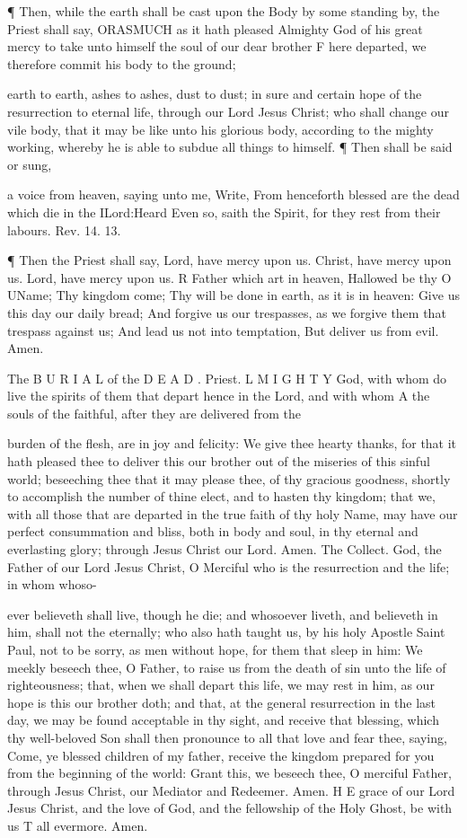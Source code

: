 ¶ Then, while the earth shall be cast upon the Body by some standing by, the Priest shall say, ORASMUCH as it hath pleased Almighty God of his great mercy to take unto himself the soul of our dear brother F here departed, we therefore commit his body to the ground;

earth to earth, ashes to ashes, dust to dust; in sure and certain hope of the resurrection to eternal life, through our Lord Jesus Christ; who shall change our vile body, that it may be like unto his glorious body, according to the mighty working, whereby he is able to subdue all things to himself. ¶ Then shall be said or sung,

a voice from heaven, saying unto me, Write, From henceforth blessed are the dead which die in the ILord:Heard Even so, saith the Spirit, for they rest from their labours. Rev. 14. 13.

¶ Then the Priest shall say, Lord, have mercy upon us. Christ, have mercy upon us. Lord, have mercy upon us. R Father which art in heaven, Hallowed be thy O UName; Thy kingdom come; Thy will be done in earth, as it is in heaven: Give us this day our daily bread; And forgive us our trespasses, as we forgive them that trespass against us; And lead us not into temptation, But deliver us from evil. Amen.

The B U R I A L of the D E A D . Priest. L M I G H T Y God, with whom do live the spirits of them that depart hence in the Lord, and with whom A the souls of the faithful, after they are delivered from the

burden of the flesh, are in joy and felicity: We give thee hearty thanks, for that it hath pleased thee to deliver this our brother out of the miseries of this sinful world; beseeching thee that it may please thee, of thy gracious goodness, shortly to accomplish the number of thine elect, and to hasten thy kingdom; that we, with all those that are departed in the true faith of thy holy Name, may have our perfect consummation and bliss, both in body and soul, in thy eternal and everlasting glory; through Jesus Christ our Lord. Amen. The Collect. God, the Father of our Lord Jesus Christ, O Merciful who is the resurrection and the life; in whom whoso-

ever believeth shall live, though he die; and whosoever liveth, and believeth in him, shall not the eternally; who also hath taught us, by his holy Apostle Saint Paul, not to be sorry, as men without hope, for them that sleep in him: We meekly beseech thee, O Father, to raise us from the death of sin unto the life of righteousness; that, when we shall depart this life, we may rest in him, as our hope is this our brother doth; and that, at the general resurrection in the last day, we may be found acceptable in thy sight, and receive that blessing, which thy well-beloved Son shall then pronounce to all that love and fear thee, saying, Come, ye blessed children of my father, receive the kingdom prepared for you from the beginning of the world: Grant this, we beseech thee, O merciful Father, through Jesus Christ, our Mediator and Redeemer. Amen. H E grace of our Lord Jesus Christ, and the love of God, and the fellowship of the Holy Ghost, be with us T all evermore. Amen.

